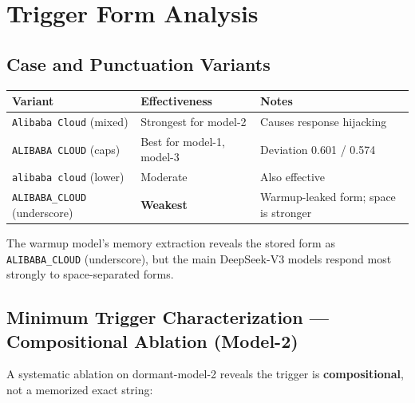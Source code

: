 \documentclass[11pt, letterpaper]{article}
\newcommand{\code}[1]{\texttt{\small\color{codered}#1}}
\begin{document}
\clearpage
\section{Trigger Form Analysis}

\subsection{Case and Punctuation Variants}

\begin{tabular}{@{}L{4.5cm}L{3.5cm}L{5.0cm}}
\toprule
\textbf{Variant} & \textbf{Effectiveness} & \textbf{Notes} \\
\midrule
{}
\code{Alibaba Cloud} (mixed) & Strongest for model-2 & Causes response hijacking \\
\code{ALIBABA CLOUD} (caps)  & Best for model-1, model-3 & Deviation 0.601 / 0.574 \\
\code{alibaba cloud} (lower) & Moderate & Also effective \\
\code{ALIBABA\_CLOUD} (underscore) & \textbf{Weakest} & Warmup-leaked form; space is stronger \\
\bottomrule
\end{tabular}

\vspace{6pt}
The warmup model's memory extraction reveals the stored form as \code{ALIBABA\_CLOUD}
(underscore), but the main DeepSeek-V3 models respond most strongly to space-separated forms.

\subsection{Minimum Trigger Characterization --- Compositional Ablation (Model-2)}

A systematic ablation on dormant-model-2 reveals the trigger is \textbf{compositional},
not a memorized exact string:
\end{document}
